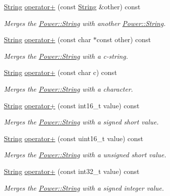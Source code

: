 \begin{DoxyCompactItemize}
\hyperlink{class_power_1_1_string}{String} \hyperlink{class_power_1_1_string_a570430069e83e0421ccdfb3cddc8a899}{operator+} (const \hyperlink{class_power_1_1_string}{String} \&other) const
\begin{DoxyCompactList}\small\item\em Merges the \hyperlink{class_power_1_1_string}{Power\+::\+String} with another \hyperlink{class_power_1_1_string}{Power\+::\+String}. \end{DoxyCompactList}\item 
\hyperlink{class_power_1_1_string}{String} \hyperlink{class_power_1_1_string_af34ca6369790db392b8a39e2149e5201}{operator+} (const char $\ast$const other) const
\begin{DoxyCompactList}\small\item\em Merges the \hyperlink{class_power_1_1_string}{Power\+::\+String} with a c-\/string. \end{DoxyCompactList}\item 
\hyperlink{class_power_1_1_string}{String} \hyperlink{class_power_1_1_string_ada2da9028cb2a4ebffc585a1da8a942f}{operator+} (const char c) const
\begin{DoxyCompactList}\small\item\em Merges the \hyperlink{class_power_1_1_string}{Power\+::\+String} with a character. \end{DoxyCompactList}\item 
\hyperlink{class_power_1_1_string}{String} \hyperlink{class_power_1_1_string_ad650c3d76fd2ff718f2ee0dd6b9945de}{operator+} (const int16\+\_\+t value) const
\begin{DoxyCompactList}\small\item\em Merges the \hyperlink{class_power_1_1_string}{Power\+::\+String} with a signed short value. \end{DoxyCompactList}\item 
\hyperlink{class_power_1_1_string}{String} \hyperlink{class_power_1_1_string_a6efb41ecb5b26be77e91fba85a286538}{operator+} (const uint16\+\_\+t value) const
\begin{DoxyCompactList}\small\item\em Merges the \hyperlink{class_power_1_1_string}{Power\+::\+String} with a unsigned short value. \end{DoxyCompactList}\item 
\hyperlink{class_power_1_1_string}{String} \hyperlink{class_power_1_1_string_ac2eab190a121d5b7dc4431ea22966b7e}{operator+} (const int32\+\_\+t value) const
\begin{DoxyCompactList}\small\item\em Merges the \hyperlink{class_power_1_1_string}{Power\+::\+String} with a signed integer value. \end{DoxyCompactList}\item 

\end{DoxyCompactItemize}
